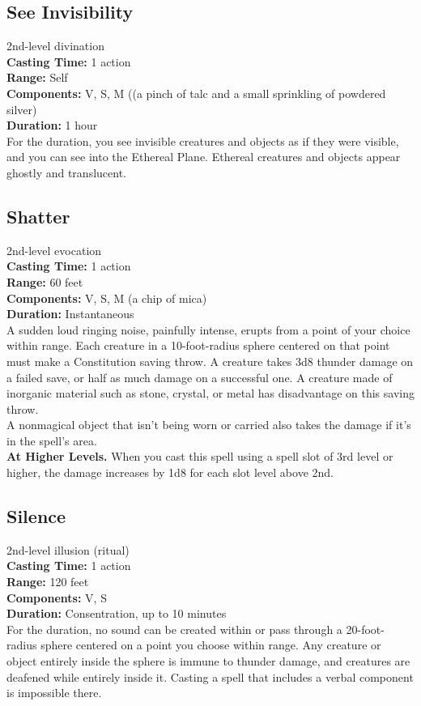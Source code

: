\documentclass[11pt, A4paper, english]{article}
\begin{document}
		\subsection{See Invisibility}
2nd-level divination \\
\textbf{Casting Time:} 1 action \\
\textbf{Range:} Self \\
\textbf{Components:} V, S, M ((a pinch of talc and a small sprinkling of powdered silver) \\
\textbf{Duration:} 1 hour \\
For the duration, you see invisible creatures and objects as if they were visible, and you can see into the Ethereal Plane. Ethereal creatures and objects appear ghostly and translucent.

		\subsection{Shatter}
2nd-level evocation \\
\textbf{Casting Time:} 1 action \\
\textbf{Range:} 60 feet \\
\textbf{Components:} V, S, M (a chip of mica) \\
\textbf{Duration:} Instantaneous \\
A sudden loud ringing noise, painfully intense, erupts from a point of your choice within range. Each creature in a 10-foot-radius sphere centered on that point must make a Constitution saving throw. A creature takes 3d8 thunder damage on a failed save, or half as much damage on a successful one. A creature made of inorganic material such as stone, crystal, or metal has disadvantage on this saving throw. \\
A nonmagical object that isn’t being worn or carried also takes the damage if it’s in the spell's area. \\
\textbf{At Higher Levels.} When you cast this spell using a spell slot of 3rd level or higher, the damage increases by 1d8 for each slot level above 2nd.

		\subsection{Silence}
2nd-level illusion (ritual) \\
\textbf{Casting Time:} 1 action \\
\textbf{Range:} 120 feet \\
\textbf{Components:} V, S \\
\textbf{Duration:} Consentration, up to 10 minutes \\
For the duration, no sound can be created within or pass through a 20-foot-radius sphere centered on a point you choose within range. Any creature or object entirely inside the sphere is immune to thunder damage, and creatures are deafened while entirely inside it. Casting a spell that includes a verbal component is impossible there.
\end{document}
